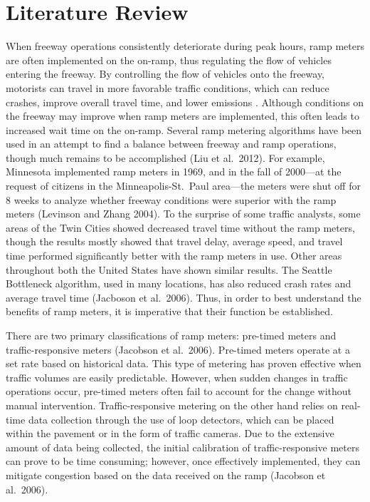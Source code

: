 \documentclass[numbered]{trbarticle}
\begin{document}
\hypertarget{literature-review}{%
\section{Literature Review}\label{literature-review}}

When freeway operations consistently deteriorate during peak hours, ramp meters are often implemented on the on-ramp, thus regulating the flow of vehicles entering the freeway. By controlling the flow of vehicles onto the freeway, motorists can travel in more favorable traffic conditions, which can reduce crashes, improve overall travel time, and lower emissions \citep{papageorgiou2002freeway}. Although conditions on the freeway may improve when ramp meters are implemented, this often leads to increased wait time on the on-ramp. Several ramp metering algorithms have been used in an attempt to find a balance between freeway and ramp operations, though much remains to be accomplished (Liu et al.~2012). For example, Minnesota implemented ramp meters in 1969, and in the fall of 2000---at the request of citizens in the Minneapolis-St.~Paul area---the meters were shut off for 8 weeks to analyze whether freeway conditions were superior with the ramp meters (Levinson and Zhang 2004). To the surprise of some traffic analysts, some areas of the Twin Cities showed decreased travel time without the ramp meters, though the results mostly showed that travel delay, average speed, and travel time performed significantly better with the ramp meters in use. Other areas throughout both the United States have shown similar results. The Seattle Bottleneck algorithm, used in many locations, has also reduced crash rates and average travel time (Jacboson et al.~2006). Thus, in order to best understand the benefits of ramp meters, it is imperative that their function be established.

There are two primary classifications of ramp meters: pre-timed meters and traffic-responsive meters (Jacobson et al.~2006). Pre-timed meters operate at a set rate based on historical data. This type of metering has proven effective when traffic volumes are easily predictable. However, when sudden changes in traffic operations occur, pre-timed meters often fail to account for the change without manual intervention. Traffic-responsive metering on the other hand relies on real-time data collection through the use of loop detectors, which can be placed within the pavement or in the form of traffic cameras. Due to the extensive amount of data being collected, the initial calibration of traffic-responsive meters can prove to be time consuming; however, once effectively implemented, they can mitigate congestion based on the data received on the ramp (Jacobson et al.~2006).
\end{document}
